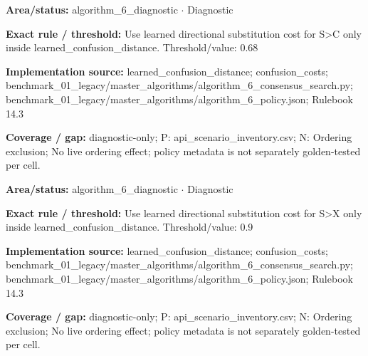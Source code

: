 \begin{tcolorbox}[enhanced,breakable,colback=white,colframe=Muted!45,boxrule=0.45pt,arc=1.5pt,left=6pt,right=6pt,top=5pt,bottom=5pt,title={\texttt{A6-LEARNED-SUBSTITUTION-S-C}},title after break={\texttt{A6-LEARNED-SUBSTITUTION-S-C}\ (continued)},fonttitle=\headingfont\bfseries\color{Navy},coltitle=Navy]
\textbf{Area/status:} algorithm\_\allowbreak{}6\_\allowbreak{}diagnostic $\boldsymbol{\cdot}$ Diagnostic\par
\smallskip
\textbf{Exact rule / threshold:} Use learned directional substitution cost for S>C only inside learned\_\allowbreak{}confusion\_\allowbreak{}distance. Threshold/\allowbreak{}value: 0.68\par
\smallskip
\textbf{Implementation source:} learned\_\allowbreak{}confusion\_\allowbreak{}distance; confusion\_\allowbreak{}costs; benchmark\_\allowbreak{}01\_\allowbreak{}legacy/\allowbreak{}master\_\allowbreak{}algorithms/\allowbreak{}algorithm\_\allowbreak{}6\_\allowbreak{}consensus\_\allowbreak{}search.py; benchmark\_\allowbreak{}01\_\allowbreak{}legacy/\allowbreak{}master\_\allowbreak{}algorithms/\allowbreak{}algorithm\_\allowbreak{}6\_\allowbreak{}policy.json; Rulebook 14.3\par
\smallskip
\textbf{Coverage / gap:} diagnostic-only; P: api\_\allowbreak{}scenario\_\allowbreak{}inventory.csv; N: Ordering exclusion; No live ordering effect; policy metadata is not separately golden-tested per cell.
\end{tcolorbox}
\begin{tcolorbox}[enhanced,breakable,colback=white,colframe=Muted!45,boxrule=0.45pt,arc=1.5pt,left=6pt,right=6pt,top=5pt,bottom=5pt,title={\texttt{A6-LEARNED-SUBSTITUTION-S-X}},title after break={\texttt{A6-LEARNED-SUBSTITUTION-S-X}\ (continued)},fonttitle=\headingfont\bfseries\color{Navy},coltitle=Navy]
\textbf{Area/status:} algorithm\_\allowbreak{}6\_\allowbreak{}diagnostic $\boldsymbol{\cdot}$ Diagnostic\par
\smallskip
\textbf{Exact rule / threshold:} Use learned directional substitution cost for S>X only inside learned\_\allowbreak{}confusion\_\allowbreak{}distance. Threshold/\allowbreak{}value: 0.9\par
\smallskip
\textbf{Implementation source:} learned\_\allowbreak{}confusion\_\allowbreak{}distance; confusion\_\allowbreak{}costs; benchmark\_\allowbreak{}01\_\allowbreak{}legacy/\allowbreak{}master\_\allowbreak{}algorithms/\allowbreak{}algorithm\_\allowbreak{}6\_\allowbreak{}consensus\_\allowbreak{}search.py; benchmark\_\allowbreak{}01\_\allowbreak{}legacy/\allowbreak{}master\_\allowbreak{}algorithms/\allowbreak{}algorithm\_\allowbreak{}6\_\allowbreak{}policy.json; Rulebook 14.3\par
\smallskip
\textbf{Coverage / gap:} diagnostic-only; P: api\_\allowbreak{}scenario\_\allowbreak{}inventory.csv; N: Ordering exclusion; No live ordering effect; policy metadata is not separately golden-tested per cell.
\end{tcolorbox}
